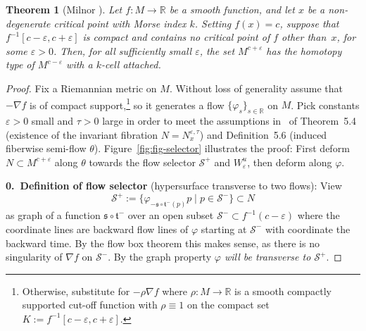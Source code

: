 \documentclass{article}
\newtheorem{theoremA}{Theorem}
\theoremstyle{definition}
\theoremstyle{remark}
\renewcommand{\1}{{{\mathchoice {\rm 1\mskip-4mu l} {\rm 1\mskip-4mu l}
{\rm 1\mskip-4.5mu l} {\rm 1\mskip-5mu l}}}}
\newcommand{\R}{{\mathbb{R}}}
\newcommand{\Ss}{{\mathcal{S}}}
\newcommand{\eps}{{\varepsilon}}
\begin{document}
\begin{theoremA}
[Milnor {\cite[I Thm.~3.2]{milnor:1963a}}]
Let $f:M\to\R$ be a smooth function, and let $x$
be a non-degenerate critical point with Morse
index $k$. Setting $f(x)=c$, suppose that
$f^{-1}[c-\eps,c+\eps]$ is compact and
contains no critical point of $f$ other than~$x$,
for some $\eps>0$. Then, for all sufficiently
small $\eps$, the set $M^{c+\eps}$ has the
homotopy type of $M^{c-\eps}$ with a
$k$-cell attached.
\end{theoremA}

\begin{proof}
Fix a Riemannian metric on $M$. 
Without loss of generality assume that $-\nabla f$
is of compact support,\footnote{
  Otherwise, substitute for $-\rho\nabla f$
  where $\rho:M\to\R$ is a smooth compactly
  supported cut-off function with $\rho\equiv 1$
  on the compact set $K:=f^{-1}[c-\eps,c+\eps]$.
  }
so it generates a flow
$\{\varphi_s\}_{s\in\R}$ on $M$.
Pick constants $\eps>0$ small and $\tau>0$ large
in order to meet the assumptions in~\cite{Weber:2015c} of
Theorem~5.4 (existence of the invariant fibration $N=N_x^{\eps,\tau}$)
and Definition~5.6 (induced fiberwise semi-flow $\theta$).
Figure~\ref{fig:fig-selector} illustrates the proof: First deform
$N\subset M^{c+\eps}$ along
$\theta$ towards the flow selector $\Ss^+$ and $W^u_\eps$,
then deform along $\varphi$.

\vspace{.1cm}
\textbf{0.~Definition of flow selector} (hypersurface
transverse to two flows): View
$$
     \Ss^+:=\{\varphi_{-\mathfrak{s}\circ\mathfrak{t}^-(p)}p\mid
     p\in\Ss^-\}\subset N
$$
as graph of a function $\mathfrak{s}\circ\mathfrak{t}^-$
over an open subset $\Ss^-\subset f^{-1}(c-\eps)$
where the coordinate lines are backward flow lines of $\varphi$
starting at $\Ss^-$ with coordinate the backward time.
By the flow box theorem this makes sense, as there
is no singularity of $\nabla f$ on $\Ss^-$. By the graph property
\emph{$\varphi$ will be transverse to $\Ss^+$}.


\end{proof}
\end{document}
